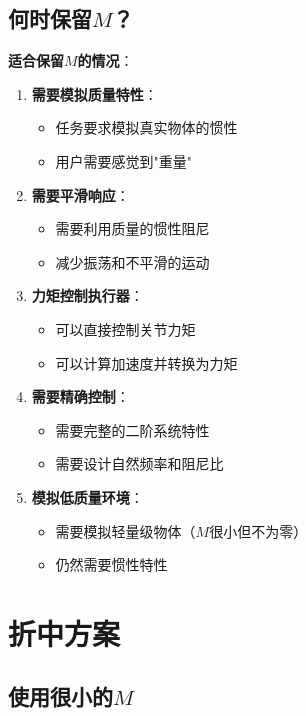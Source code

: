 \documentclass[12pt,a4paper]{article}
\begin{document}
\subsection{何时保留$M$？}

\textbf{适合保留$M$的情况}：
\begin{enumerate}
\item \textbf{需要模拟质量特性}：
\begin{itemize}
\item 任务要求模拟真实物体的惯性
\item 用户需要感觉到"重量"
\end{itemize}

\item \textbf{需要平滑响应}：
\begin{itemize}
\item 需要利用质量的惯性阻尼
\item 减少振荡和不平滑的运动
\end{itemize}

\item \textbf{力矩控制执行器}：
\begin{itemize}
\item 可以直接控制关节力矩
\item 可以计算加速度并转换为力矩
\end{itemize}

\item \textbf{需要精确控制}：
\begin{itemize}
\item 需要完整的二阶系统特性
\item 需要设计自然频率和阻尼比
\end{itemize}

\item \textbf{模拟低质量环境}：
\begin{itemize}
\item 需要模拟轻量级物体（$M$很小但不为零）
\item 仍然需要惯性特性
\end{itemize}
\end{enumerate}

\section{折中方案}

\subsection{使用很小的$M$}
\end{document}

